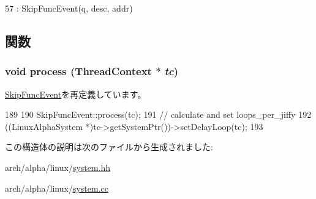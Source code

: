 \begin{DoxyCode}
57             : SkipFuncEvent(q, desc, addr) {}
\end{DoxyCode}


\subsection{関数}
\hypertarget{structLinuxAlphaSystem_1_1SkipDelayLoopEvent_ad66a9d5ec7cfe597b848a17c0df5cc28}{
\subsubsection[{process}]{\setlength{\rightskip}{0pt plus 5cm}void process ({\bf ThreadContext} $\ast$ {\em tc})}}
\label{structLinuxAlphaSystem_1_1SkipDelayLoopEvent_ad66a9d5ec7cfe597b848a17c0df5cc28}


\hyperlink{classSkipFuncEvent_ad66a9d5ec7cfe597b848a17c0df5cc28}{SkipFuncEvent}を再定義しています。


\begin{DoxyCode}
189 {
190     SkipFuncEvent::process(tc);
191     // calculate and set loops_per_jiffy
192     ((LinuxAlphaSystem *)tc->getSystemPtr())->setDelayLoop(tc);
193 }
\end{DoxyCode}


この構造体の説明は次のファイルから生成されました:\begin{DoxyCompactItemize}
\item 
arch/alpha/linux/\hyperlink{arch_2alpha_2linux_2system_8hh}{system.hh}\item 
arch/alpha/linux/\hyperlink{arch_2alpha_2linux_2system_8cc}{system.cc}\end{DoxyCompactItemize}
